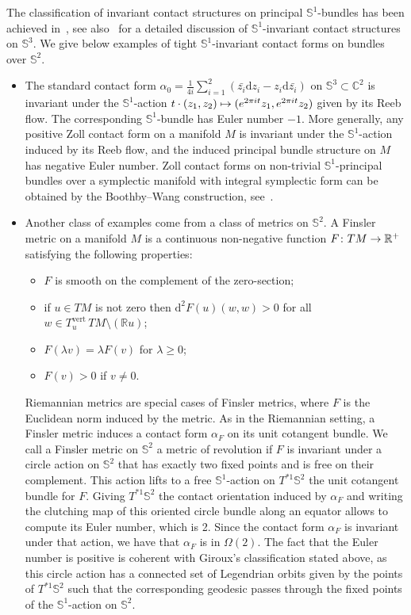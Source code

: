\documentclass[AHL,Unicode,longabstracts]{cedram}
\DeclareMathOperator{\vertt}{vert}
\newcommand{\bbS}{\mathbb{S}}
\newcommand{\bbR}{\mathbb{R}}
\newcommand{\bbC}{\mathbb{C}}
\newcommand{\rmd}{\mathrm{d}}
\renewcommand*{\to}{\mathchoice{\longrightarrow}{\rightarrow}{\rightarrow}{\rightarrow}}
\let\oldmapsto\mapsto
\renewcommand*{\mapsto}{\mathchoice{\longmapsto}{\oldmapsto}{\oldmapsto}{\oldmapsto}}
\newcommand{\bbS}{\mathbb{S}}
\begin{document}
The classification of invariant contact structures on principal $\bbS^1$-bundles has been achieved in~\cite[second proposition p.~6, Theorem p.~7]{Lutz1977}, see also~\cite[Section~5]{GeigesHedickeSaglam} for a detailed discussion of $\bbS^1$-invariant contact structures on $\bbS^3$. We give below examples of tight $\bbS^1$-invariant contact forms on bundles over $\bbS^2$.
\begin{itemize}
\item The standard contact form $\alpha_0 = \frac{1}{4i}\sum_{i=1}^{2}\left(\bar{z_i} \rmd z_i - z_i \rmd \bar{z_i} \right)$ on $\bbS^3 \subset \bbC ^2$ is invariant under the $\bbS^1$-action $t \cdot (z_1, z_2) \mapsto (e^{2 \pi i t}z_1, e^{2 \pi i t}z_2)$ given by its Reeb flow. The corresponding $\bbS^1$-bundle has Euler number $-1$. More generally, any positive Zoll contact form on a manifold $M$ is invariant under the $\bbS^1$-action induced by its Reeb flow, and the induced principal bundle structure on $M$ has negative Euler number. Zoll contact forms on non-trivial $\bbS^1$-principal bundles over a symplectic manifold with integral symplectic form can be obtained by the Boothby--Wang construction, see~\cite[Section~7.2]{geiges_2008}.

\item Another class of examples come from a class of metrics on $\bbS^2$. A Finsler metric on a manifold $M$ is a continuous non-negative function $F \colon TM \to \bbR^+$ satisfying the following properties:
\begin{itemize}
\item $F$ is smooth on the complement of the zero-section;
\item if $u \in TM$ is not zero then $\rmd ^2F(u)(w,w) > 0$ for all $w \in T^{\vertt}_u\,TM \setminus (\bbR u)$;
\item $F(\lambda v) = \lambda F(v)$ for $\lambda \geq 0$;
\item $F(v) > 0$ if $v \neq 0$.
\end{itemize}
Riemannian metrics are special cases of Finsler metrics, where $F$ is the Euclidean norm induced by the metric. As in the Riemannian setting, a Finsler metric induces a contact form $\alpha_F$ on its unit cotangent bundle. We call a Finsler metric on $\bbS^2$ a metric of revolution if $F$ is invariant under a circle action on $\bbS^2$ that has exactly two fixed points and is free on their complement. This action lifts to a free $\bbS^1$-action on $T^{*1} \bbS^2$ the unit cotangent bundle for $F$. Giving $T^{*1}\bbS^2$ the contact orientation induced by $\alpha_F$ and writing the clutching map of this oriented circle bundle along an equator allows to compute its Euler number, which is 2. Since the contact form $\alpha_F$ is invariant under that action, we have that $\alpha_F$ is in $\Omega(2)$. The fact that the Euler number is positive is coherent with Giroux's classification stated above, as this circle action has a connected set of Legendrian orbits given by the points of $T^{*1}\bbS^2$ such that the corresponding geodesic passes through the fixed points of the $\bbS^1$-action on $\bbS^2$.



\end{itemize}
\end{document}
